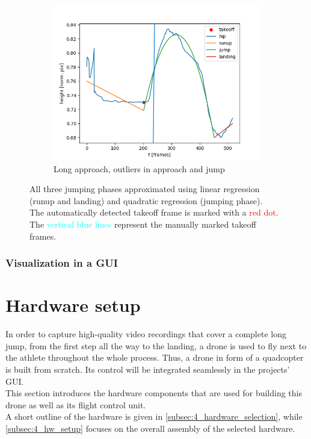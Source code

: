 \begin{figure}[h!]
\begin{subfigure}{0.45\textwidth}
        \includegraphics[width=\textwidth]{regression_poor_approach_jump.png}
        \caption{Long approach, outliers in approach and jump}
    \end{subfigure}
    \caption[Automatic takeoff frame detection results]{
        All three jumping phases approximated using linear regression
        (runup and landing) and quadratic regression (jumping phase).\\
        The automatically detected takeoff frame is marked with a
        \textcolor{red}{red dot}.\\
        The \textcolor{cyan}{vertical blue lines} represent the manually marked
        takeoff frames.}
\label{fig:4_automatic_takeoff_results}
\end{figure}
\FloatBarrier

\subsubsection{Visualization in a \acs*{GUI}}\label{subsec:4_lj_software_gui}

\section{Hardware setup}\label{sec:4_hardware}
In order to capture high-quality video recordings that cover a complete long 
jump, from the first step all the way to the landing, a drone is used to fly
next to the athlete throughout the whole process.
Thus, a drone in form of a quadcopter is built from scratch.
Its control will be integrated seamlessly in the projects' \ac{GUI}.\\
This section introduces the hardware components that are used for building 
this drone as well as its flight control unit.\\
A short outline of the hardware is given in 
\autoref{subsec:4_hardware_selection},
while \autoref{subsec:4_hw_setup} focuses on the overall assembly of the 
selected hardware.

